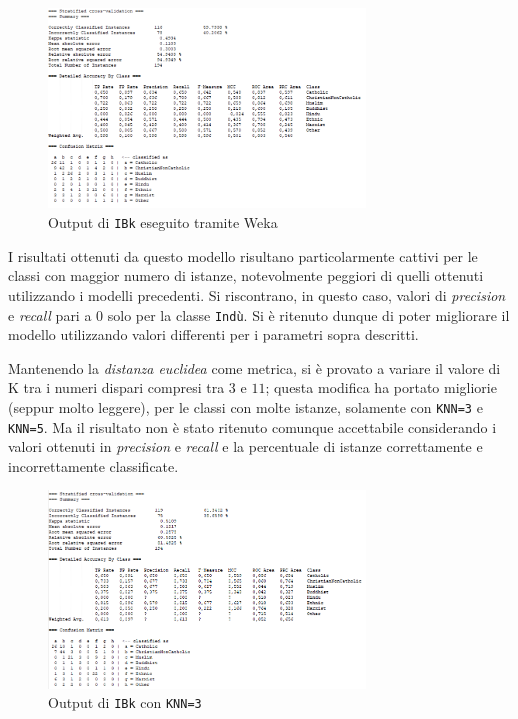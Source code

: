 \documentclass[a4paper,11pt,twoside,notitlepage,final]{scrartcl}
\begin{document}
\begin{figure}[H]
  \centering
  \includegraphics[width=0.75\textwidth]{fig/kNN1.PNG}%
  \caption{Output di \texttt{IBk} eseguito tramite Weka}%
  \label{fig:ibk:1}
\end{figure}

I risultati ottenuti da questo modello risultano particolarmente cattivi per le classi con maggior numero di istanze, notevolmente peggiori di quelli ottenuti utilizzando i modelli precedenti.
Si riscontrano, in questo caso, valori di \emph{precision} e \emph{recall} pari a \(0\) solo per la classe \texttt{Indù}.
Si è ritenuto dunque di poter migliorare il modello utilizzando valori differenti per i parametri sopra descritti.

Mantenendo la \emph{distanza euclidea} come metrica, si è provato a variare il valore di K tra i numeri dispari compresi tra \(3\) e \(11\);
questa modifica ha portato migliorie (seppur molto leggere), per le classi con molte istanze, solamente con \texttt{KNN=3} e \texttt{KNN=5}.
Ma il risultato non è stato ritenuto comunque accettabile considerando i valori ottenuti in \emph{precision} e \emph{recall} e la percentuale di istanze correttamente e incorrettamente classificate.

\begin{figure}[H]
  \centering
  \includegraphics[width=0.75\textwidth]{fig/kNN3.PNG}%
  \caption{Output di \texttt{IBk} con \texttt{KNN=3}}%
  \label{fig:ibk:9}
\end{figure}
\end{document}
